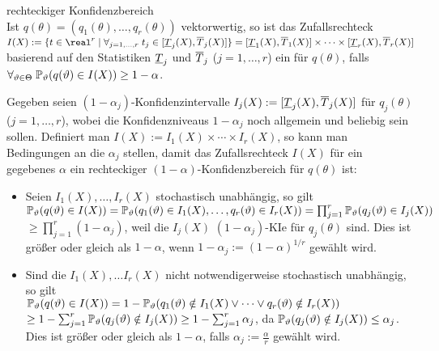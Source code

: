 \linie
\pagebreak

\begin{Def}{rechteckiger Konfidenzbereich}\\
    Ist $q(\theta) = (q_1(\theta), \dotsc, q_r(\theta))$ vektorwertig, so ist das Zufallsrechteck\\
    $I(X) := \{t \in \real^r \;|\; \forall_{j=1,\dotsc, r}\; t_j \in [\Tu_j(X), \To_j(X)]\}
    = [\Tu_1(X), \To_1(X)] \times \dotsb \times [\Tu_r(X), \To_r(X)]$
    basierend auf den Statistiken $\underline{T}_j$ und $\overline{T}_j$ ($j = 1, \dotsc, r$) ein
     für $q(\theta)$, falls
    $\forall_{\vartheta \in \Theta}\; \mathbb{P}_\vartheta(q(\vartheta) \in I(X)) \ge 1 - \alpha$.
\end{Def}

\begin{Bem}
    Gegeben seien $(1 - \alpha_j)$-Konfidenzintervalle $I_j(X) := [\underline{T}_j(X), \overline{T}_j(X)]$
    für $q_j(\theta)$ ($j = 1, \dotsc, r$), wobei die Konfidenzniveaus $1 - \alpha_j$ noch
    allgemein und beliebig sein sollen.
    Definiert man $I(X) := I_1(X) \times \dotsb \times I_r(X)$, so kann man Bedingungen an die
    $\alpha_j$ stellen, damit das Zufallsrechteck $I(X)$ für ein gegebenes $\alpha$
    ein rechteckiger $(1 - \alpha)$-Konfidenzbereich für $q(\theta)$ ist:
    \begin{itemize}
        \item
        Seien $I_1(X), \dotsc, I_r(X)$ stochastisch unabhängig,
        so gilt\\
        $\mathbb{P}_\vartheta(q(\vartheta) \in I(X)) = \mathbb{P}_\vartheta(q_1(\vartheta) \in I_1(X), \dotsc,
        q_r(\vartheta) \in I_r(X)) = \prod_{j=1}^r \mathbb{P}_\vartheta(q_j(\vartheta) \in I_j(X))$\\
        $\ge \prod_{j=1}^r (1 - \alpha_j)$,
        weil die $I_j(X)$ $(1 - \alpha_j)$-KIe für $q_j(\theta)$ sind.
        Dies ist größer oder gleich als $1 - \alpha$, wenn $1 - \alpha_j := (1 - \alpha)^{1/r}$
        gewählt wird.
        
        \item
        Sind die $I_1(X), \dotsc I_r(X)$ nicht notwendigerweise stochastisch unabhängig,
        so gilt\\
        $\mathbb{P}_\vartheta(q(\vartheta) \in I(X)) = 1 -
        \mathbb{P}_\vartheta(q_1(\vartheta) \notin I_1(X) \lor \dotsb \lor q_r(\vartheta) \notin I_r(X))$\\
        $\ge 1 - \sum_{j=1}^r \mathbb{P}_\vartheta(q_j(\vartheta) \notin I_j(X))
        \ge 1 - \sum_{j=1}^r \alpha_j$,
        da $\mathbb{P}_\vartheta(q_j(\vartheta) \notin I_j(X)) \le \alpha_j$.
        Dies ist größer oder gleich als $1 - \alpha$, falls $\alpha_j := \frac{\alpha}{r}$
        gewählt wird.
    \end{itemize}
\end{Bem}

